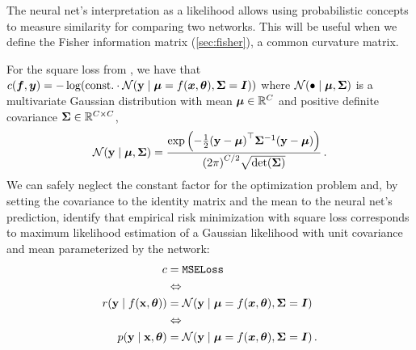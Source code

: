 The neural net's interpretation as a likelihood allows using probabilistic concepts to measure similarity for comparing two networks.
This will be useful when we define the Fisher information matrix (\cref{sec:fisher}), a common curvature matrix.

\switchcolumn[1]
\begin{example}\label{ex:square_loss_probabilistic}
  For the square loss from , we have that $c({\bm{f}}, {\bm{y}}) = - \log( \mathrm{const.}
  \cdot {\mathcal{N}}({\mathbf{y}} \mid {\bm{\mu}} = f({\bm{x}}, {\bm{\theta}}), {\bm{\Sigma}} = {\bm{I}}))$ where ${\mathcal{N}}(\bullet \mid {\bm{\mu}}, {\bm{\Sigma}})$ is a multivariate Gaussian distribution with mean ${\bm{\mu}} \in {\mathbb{R}}^C$ and positive definite covariance ${\bm{\Sigma}} \in {\mathbb{R}}^{C \times C}$,
  \begin{align*}
    {\mathcal{N}}({\mathbf{y}} \mid {\bm{\mu}}, {\bm{\Sigma}})
    =
    \frac{
    \exp\left( -\frac{1}{2} {({\mathbf{y}} - {\bm{\mu}})}^\top {\bm{\Sigma}}^{-1} ({\mathbf{y}} - {\bm{\mu}}) \right)
    }{{(2\pi)}^{C/2} \sqrt{\det({\bm{\Sigma}})}}\,.
  \end{align*}
  We can safely neglect the constant factor for the optimization problem and, by setting the covariance to the identity matrix and the mean to the neural net's prediction, identify that empirical risk minimization with square loss corresponds to maximum likelihood estimation of a Gaussian likelihood with unit covariance and mean parameterized by the network:
  \begin{align*}
    c                             & = \text{\texttt{MSELoss}}
    \\
                                  & \Leftrightarrow
    \\
    r({\mathbf{y}} \mid f({\mathbf{x}}, {\bm{\theta}})) & = {\mathcal{N}}({\mathbf{y}} \mid {\bm{\mu}} = f({\bm{x}}, {\bm{\theta}}), {\bm{\Sigma}} = {\bm{I}})\,
    \\
                                  & \Leftrightarrow
    \\
    p({\mathbf{y}} \mid {\mathbf{x}}, {\bm{\theta}})    & = {\mathcal{N}}({\mathbf{y}} \mid {\bm{\mu}} = f({\bm{x}}, {\bm{\theta}}), {\bm{\Sigma}} = {\bm{I}})\,.
  \end{align*}
\end{example}

